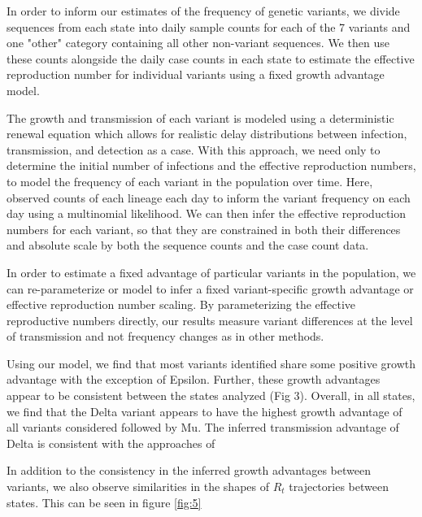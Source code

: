 \documentclass[11pt,oneside,letterpaper]{article}
\begin{document}
In order to inform our estimates of the frequency of genetic variants, we divide sequences from each state into daily sample counts for each of the 7 variants and one "other" category containing all other non-variant sequences.
We then use these counts alongside the daily case counts in each state to estimate the effective reproduction number for individual variants using a fixed growth advantage model.

The growth and transmission of each variant is modeled using a deterministic renewal equation which allows for realistic delay distributions between infection, transmission, and detection as a case.
With this approach, we need only to determine the initial number of infections and the effective reproduction numbers, to model the frequency of each variant in the population over time.
Here, observed counts of each lineage each day to inform the variant frequency on each day using a multinomial likelihood.
We can then infer the effective reproduction numbers for each variant, so that they are constrained in both their differences and absolute scale by both the sequence counts and the case count data.

In order to estimate a fixed advantage of particular variants in the population, we can re-parameterize or model to infer a fixed variant-specific growth advantage or effective reproduction number scaling.
By parameterizing the effective reproductive numbers directly, our results measure variant differences at the level of transmission and not frequency changes as in other methods.

Using our model, we find that most variants identified share some positive growth advantage with the exception of Epsilon.
Further, these growth advantages appear to be consistent between the states analyzed (Fig 3).
Overall, in all states, we find that the Delta variant appears to have the highest growth advantage of all variants considered followed by Mu.
The inferred transmission advantage of Delta is consistent with the approaches of %

In addition to the consistency in the inferred growth advantages between variants, we also observe similarities in the shapes of $R_{t}$ trajectories between states. This can be seen in figure \ref{fig:5} %
\end{document}
